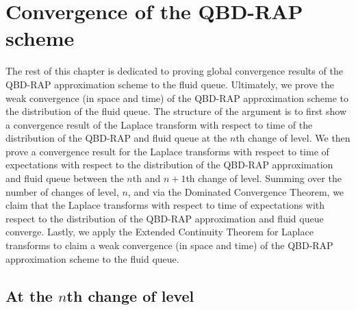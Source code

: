 \section{Convergence of the QBD-RAP scheme}\label{sec: local to global}
The rest of this chapter is dedicated to proving global convergence results of the QBD-RAP approximation scheme to the fluid queue. Ultimately, we prove the weak convergence (in space and time) of the QBD-RAP approximation scheme to the distribution of the fluid queue. The structure of the argument is to first show a convergence result of the Laplace transform with respect to time of the distribution of the QBD-RAP and fluid queue at the \(n\)th change of level. We then prove a convergence result for the Laplace transforms with respect to time of expectations with respect to the distribution of the QBD-RAP approximation and fluid queue between the \(n\)th and \(n+1\)th change of level. Summing over the number of changes of level, \(n\), and via the Dominated Convergence Theorem, we claim that the Laplace transforms with respect to time of expectations with respect to the distribution of the QBD-RAP approximation and fluid queue converge. Lastly, we apply the Extended Continuity Theorem for Laplace transforms \cite[Chapter XIII, Theorem 2a]{feller1957} to claim a weak convergence (in space and time) of the QBD-RAP approximation scheme to the fluid queue.

\subsection{At the \(n\)th change of level}\label{sec: nth change}

